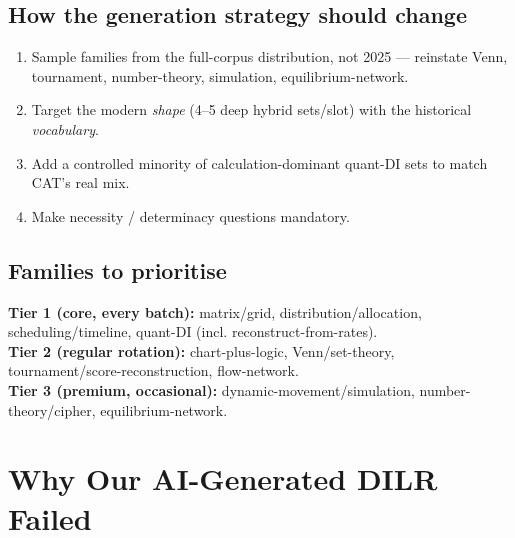 \documentclass[11pt,a4paper]{article}
\begin{document}
\subsection{How the generation strategy should change}
\begin{enumerate}[leftmargin=1.6em]
\item Sample families from the full-corpus distribution, not 2025 --- reinstate Venn, tournament, number-theory, simulation, equilibrium-network.
\item Target the modern \emph{shape} (4--5 deep hybrid sets/slot) with the historical \emph{vocabulary}.
\item Add a controlled minority of calculation-dominant quant-DI sets to match CAT's real mix.
\item Make necessity / determinacy questions mandatory.
\end{enumerate}

\subsection{Families to prioritise}
\textbf{Tier 1 (core, every batch):} matrix/grid, distribution/allocation, scheduling/timeline, quant-DI (incl. reconstruct-from-rates).\\
\textbf{Tier 2 (regular rotation):} chart-plus-logic, Venn/set-theory, tournament/score-reconstruction, flow-network.\\
\textbf{Tier 3 (premium, occasional):} dynamic-movement/simulation, number-theory/cipher, equilibrium-network.

\section{Why Our AI-Generated DILR Failed}
\end{document}
